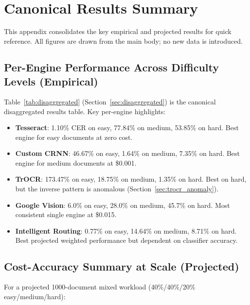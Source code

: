 \documentclass[12pt,a4paper]{article}
\begin{document}

\newpage

\appendix

\section{Canonical Results Summary}

This appendix consolidates the key empirical and projected results
for quick reference. All figures are drawn from the main body; no
new data is introduced.

\subsection{Per-Engine Performance Across Difficulty Levels
  (Empirical)}

Table~\ref{tab:disaggregated} (Section~\ref{sec:disaggregated}) is
the canonical disaggregated results table. Key per-engine
highlights:

\begin{itemize}
  \item \textbf{Tesseract}: 1.10\% CER on easy, 77.84\% on medium,
    53.85\% on hard. Best engine for easy documents at zero cost.
  \item \textbf{Custom CRNN}: 46.67\% on easy, 1.64\% on medium,
    7.35\% on hard. Best engine for medium documents at \$0.001.
  \item \textbf{TrOCR}: 173.47\% on easy, 18.75\% on medium, 1.35\%
    on hard. Best on hard, but the inverse pattern is anomalous
    (Section~\ref{sec:trocr_anomaly}).
  \item \textbf{Google Vision}: 6.0\% on easy, 28.0\% on medium,
    45.7\% on hard. Most consistent single engine at \$0.015.
  \item \textbf{Intelligent Routing}: 0.77\% on easy, 14.64\% on
    medium, 8.71\% on hard. Best projected weighted performance
    but dependent on classifier accuracy.
\end{itemize}

\subsection{Cost-Accuracy Summary at Scale (Projected)}

For a projected 1000-document mixed workload (40\%/40\%/20\%
easy/medium/hard):
\end{document}
